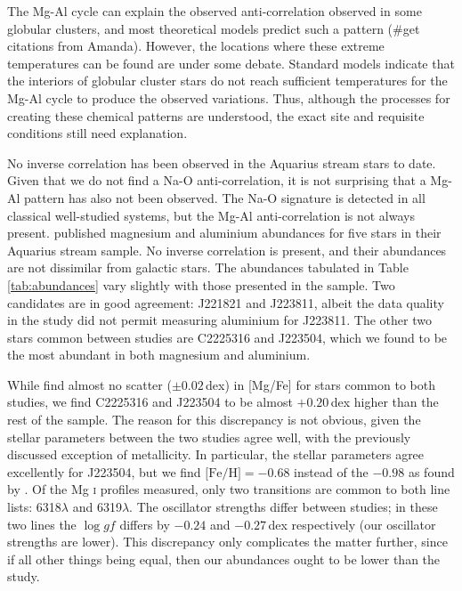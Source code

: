 \documentclass{emulateapj}
\begin{document}
The Mg-Al cycle can explain the observed anti-correlation observed in some globular clusters, and most theoretical models predict such a pattern (\#get citations from Amanda). However, the locations where these extreme temperatures can be found are under some debate. Standard models indicate that the interiors of globular cluster stars do not reach sufficient temperatures for the Mg-Al cycle to produce the observed variations. Thus, although the processes for creating these chemical patterns are understood, the exact site and requisite conditions still need explanation.

No inverse correlation has been observed in the Aquarius stream stars to date. Given that we do not find a Na-O anti-correlation, it is not surprising that a Mg-Al pattern has also not been observed. The Na-O signature is detected in all classical well-studied systems, but the Mg-Al anti-correlation is not always present. \citet{wylie-de-boer;et-al_2012} published magnesium and aluminium abundances for five stars in their Aquarius stream sample. No inverse correlation is present, and their abundances are not dissimilar from galactic stars. The abundances tabulated in Table \ref{tab:abundances} vary slightly with those presented in the \citet{wylie-de-boer;et-al_2012} sample. Two candidates are in good agreement: J221821 and J223811, albeit the data quality in the \citet{wylie-de-boer;et-al_2012} study did not permit measuring aluminium for J223811. The other two stars common between studies are C2225316 and J223504, which we found to be the most abundant in both magnesium and aluminium. 



While \citet{wylie-de-boer;et-al_2012} find almost no scatter ($\pm0.02$\,dex) in [Mg/Fe] for stars common to both studies, we find C2225316 and J223504 to be almost $+0.20$\,dex higher than the rest of the sample. The reason for this discrepancy is not obvious, given the stellar parameters between the two studies agree well, with the previously discussed exception of metallicity. In particular, the stellar parameters agree excellently for J223504, but we find $\mbox{[Fe/H]} = -0.68$ instead of the $-0.98$ as found by \citet{wylie-de-boer;et-al_2012}. Of the Mg \textsc{i} profiles measured, only two transitions are common to both line lists: 6318$\lambda$ and 6319$\lambda$. The oscillator strengths differ between studies; in these two lines the $\log{gf}$ differs by $-0.24$ and $-0.27$\,dex respectively (our oscillator strengths are lower). This discrepancy only complicates the matter further, since if all other things being equal, then our abundances ought to be lower than the \citet{wylie-de-boer;et-al_2012} study. 
\end{document}
